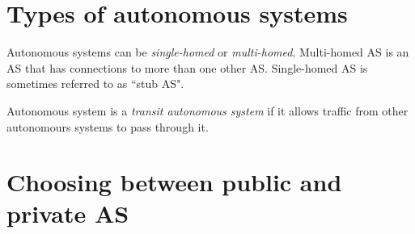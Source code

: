 \section{Types of autonomous systems}

Autonomous systems can be \emph{single-homed} or \emph{multi-homed}. Multi-homed AS is an AS that has connections to more than
one other AS. Single-homed AS is sometimes referred to as ``stub AS".

Autonomous system is a \emph{transit autonomous system} if it allows traffic from other autonomours systems to pass through it.

\section{Choosing between public and private AS}


